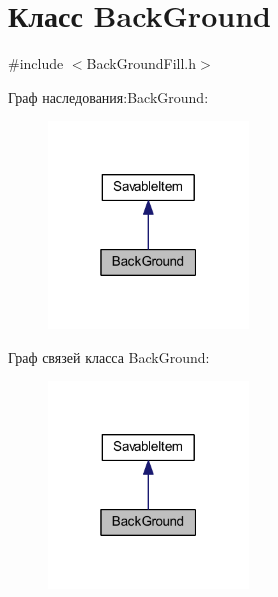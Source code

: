 \hypertarget{class_back_ground}{\section{Класс Back\-Ground}
\label{class_back_ground}
}


{\ttfamily \#include $<$Back\-Ground\-Fill.\-h$>$}



Граф наследования\-:Back\-Ground\-:
\nopagebreak
\begin{figure}[H]
\begin{center}
\leavevmode
\includegraphics[width=151pt]{class_back_ground__inherit__graph}
\end{center}
\end{figure}


Граф связей класса Back\-Ground\-:
\nopagebreak
\begin{figure}[H]
\begin{center}
\leavevmode
\includegraphics[width=151pt]{class_back_ground__coll__graph}
\end{center}
\end{figure}
